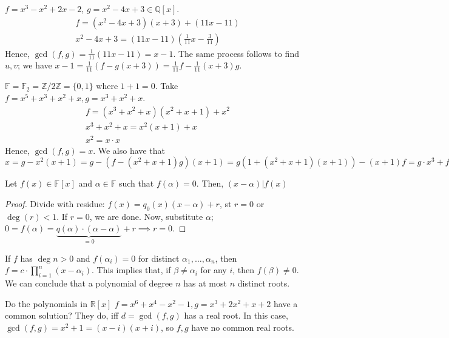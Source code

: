 \documentclass[12pt,oneside]{article}
\begin{document}
\begin{example}
  $f = x^3 - x^2 + 2x - 2$, $g = x^2 - 4x + 3 \in \mathbb{Q}[x]$.
  \begin{align*}
    f = (x^2 - 4x + 3)(x+3) + (11x-11)\\
    x^2 - 4x + 3 = (11x-11)(\frac{1}{11}x-\frac{3}{11})
  \end{align*}
  Hence, $\gcd(f,g) = \frac{1}{11}(11x - 11) = x-1$. The same process follows to find $u,v$; we have $x - 1 = \frac{1}{11}(f-g(x+3)) = \frac{1}{11}f - \frac{1}{11}(x+3)g$.
\end{example}

\begin{example}
  $\mathbb{F} = \mathbb{F}_2 = \mathbb{Z}/2\mathbb{Z} = \{0,1\}$ where $1 + 1 =0$. Take $f = x^5 + x^3 + x^2 + x, g = x^3 + x^2 + x$.\begin{align*}
    f = (x^3+x^2+x)(x^2+x+1) + x^2\\
    x^3+x^2+x = x^2(x+1) + x\\
    x^2 = x \cdot x
  \end{align*}
  Hence, $\gcd (f,g) = x$. We also have that $x = g - x^2(x+1) = g-(f-(x^2+x+1)g)(x+1) = g(1+(x^2+x+1)(x+1)) - (x+1)f = g \cdot x^3 + f\cdot (x+1)$
\end{example}

\begin{lemma}
  Let $f(x) \in \mathbb{F}[x]$ and $\alpha \in \mathbb{F}$ such that $f(\alpha) = 0$. Then, $(x-\alpha) | f(x)$
\end{lemma}

\begin{proof}
  Divide with residue: $f(x) = q_0 (x) (x-\alpha) + r$, st $r = 0$ or $\deg (r) < 1$. If $r = 0$, we are done. Now, substitute $\alpha$; $0 = f(\alpha) = \underbrace{q(\alpha)\cdot (\alpha - \alpha)}_{=0} + r \implies r = 0$.
\end{proof}

\begin{corollary}
  If $f$ has $\deg n > 0$ and $f(\alpha_i) = 0$ for distinct $\alpha_1, \dots, \alpha_n$, then $f = c \cdot \prod_{i=1}^{n} (x-\alpha_i)$. This implies that, if $\beta \neq \alpha_i$ for any $i$, then $f(\beta) \neq 0$. We can conclude that a polynomial of degree $n$ has at most $n$ distinct roots.
\end{corollary}

\begin{example}
  Do the polynomials in $\mathbb{R}[x]$ $f = x^6 + x^4 - x^2 - 1, g = x^3 + 2x^2 + x + 2$ have a common solution? They do, iff $d = \gcd(f,g)$ has a real root. In this case, $\gcd(f,g) = x^2 + 1 = (x-i)(x+i)$, so $f,g$ have no common real roots.
\end{example}
\end{document}
